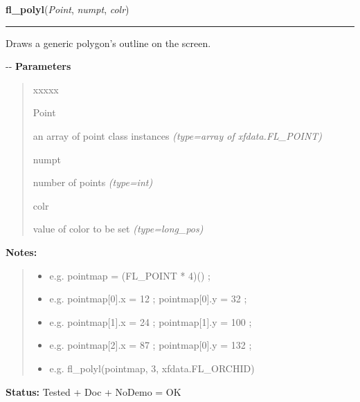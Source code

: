     \label{xformslib:flxbasic:fl_polyl}

    \vspace{0.5ex}

\hspace{.8\funcindent}\begin{boxedminipage}{\funcwidth}

    \raggedright \textbf{fl\_polyl}(\textit{Point}, \textit{numpt}, \textit{colr})

    \vspace{-1.5ex}

    \rule{\textwidth}{0.5\fboxrule}
\setlength{\parskip}{2ex}

Draws a generic polygon's outline on the screen.

-{}-
\setlength{\parskip}{1ex}
      \textbf{Parameters}
      \vspace{-1ex}

      \begin{quote}
        \begin{Ventry}{xxxxx}

          \item[Point]


an array of point class instances
            {\it (type=array of xfdata.FL\_POINT)}

          \item[numpt]


number of points
            {\it (type=int)}

          \item[colr]


value of color to be set
            {\it (type=long\_pos)}

        \end{Ventry}

      \end{quote}

\textbf{Notes:}
\begin{quote}
  \begin{itemize}

  \item
    \setlength{\parskip}{0.6ex}

e.g. pointmap = (FL\_POINT * 4)() ;


  \item 
e.g. pointmap{[}0{]}.x = 12 ; pointmap{[}0{]}.y = 32 ;


  \item 
e.g. pointmap{[}1{]}.x = 24 ; pointmap{[}1{]}.y = 100 ;


  \item 
e.g. pointmap{[}2{]}.x = 87 ; pointmap{[}0{]}.y = 132 ;


  \item 
e.g. fl\_polyl(pointmap, 3, xfdata.FL\_ORCHID)


\end{itemize}

\end{quote}

\textbf{Status:} 
Tested + Doc + NoDemo = OK


    \end{boxedminipage}

